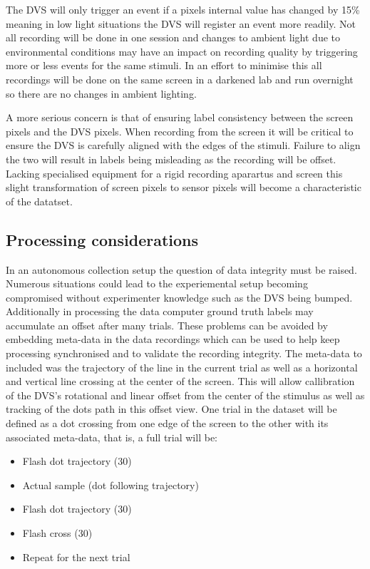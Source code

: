 The DVS will only trigger an event if a pixels internal value has changed by 15\% meaning in low light situations the DVS will register an event more readily. 
Not all recording will be done in one session and changes to ambient light due to environmental conditions may have an impact on recording quality by triggering more or less events for the same stimuli.
In an effort to minimise this all recordings will be done on the same screen in a darkened lab and run overnight so there are no changes in ambient lighting. 

A more serious concern is that of ensuring label consistency between the screen pixels and the DVS pixels. 
When recording from the screen it will be critical to ensure the DVS is carefully aligned with the edges of the stimuli.
Failure to align the two will result in labels being misleading as the recording will be offset.
Lacking specialised equipment for a rigid recording aparartus and screen this slight transformation of screen pixels to sensor pixels will become a characteristic of the datatset. 

\subsection{Processing considerations}
In an autonomous collection setup the question of data integrity must be raised.
Numerous situations could lead to the experiemental setup becoming compromised without experimenter knowledge such as the DVS being bumped.
Additionally in processing the data computer ground truth labels may accumulate an offset after many trials.
These problems can be avoided by embedding meta-data in the data recordings which can be used to help keep processing synchronised and to validate the recording integrity. 
The meta-data to included was the trajectory of the line in the current trial as well as a horizontal and vertical line crossing at the center of the screen.
This will allow callibration of the DVS's rotational and linear offset from the center of the stimulus as well as tracking of the dots path in this offset view. 
One trial in the dataset will be defined as a dot crossing from one edge of the screen to the other with its associated meta-data, that is, a full trial will be:

\begin{itemize}
    \itemsep-0.5em
    \item Flash dot trajectory (30\ms)
    \item Actual sample (dot following trajectory)
    \item Flash dot trajectory (30\ms)
    \item Flash cross (30\ms)
    \item Repeat for the next trial
\end{itemize}

